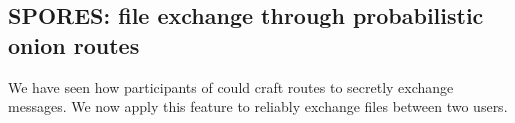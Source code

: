 









\subsection{SPORES: file exchange through probabilistic onion routes}
\label{ssec:spores_file_exchange_through_probabilistic_onion_routes}


We have seen how participants of \name could craft routes to secretly exchange messages.
We now apply this feature to reliably exchange files between two users.

